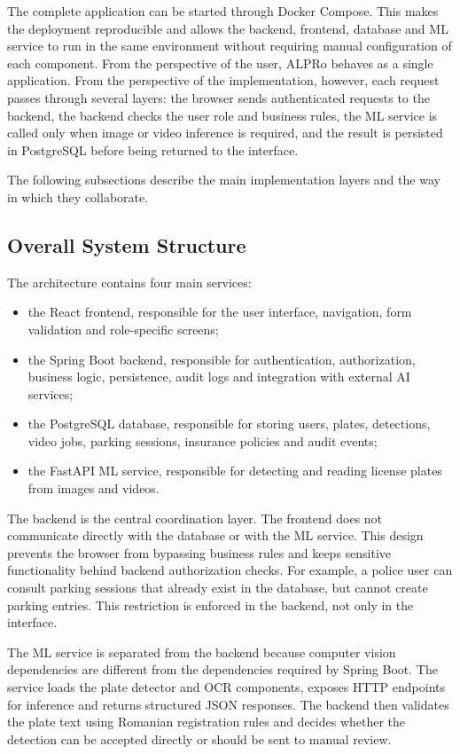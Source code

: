 ﻿\documentclass[12pt,a4paper]{article}
\begin{document}
The complete application can be started through Docker Compose. This makes the deployment reproducible and allows the backend, frontend, database and ML service to run in the same environment without requiring manual configuration of each component. From the perspective of the user, ALPRo behaves as a single application. From the perspective of the implementation, however, each request passes through several layers: the browser sends authenticated requests to the backend, the backend checks the user role and business rules, the ML service is called only when image or video inference is required, and the result is persisted in PostgreSQL before being returned to the interface.

The following subsections describe the main implementation layers and the way in which they collaborate.

\subsection{Overall System Structure}

The architecture contains four main services:

\begin{itemize}
    \item the React frontend, responsible for the user interface, navigation, form validation and role-specific screens;
    \item the Spring Boot backend, responsible for authentication, authorization, business logic, persistence, audit logs and integration with external AI services;
    \item the PostgreSQL database, responsible for storing users, plates, detections, video jobs, parking sessions, insurance policies and audit events;
    \item the FastAPI ML service, responsible for detecting and reading license plates from images and videos.
\end{itemize}

The backend is the central coordination layer. The frontend does not communicate directly with the database or with the ML service. This design prevents the browser from bypassing business rules and keeps sensitive functionality behind backend authorization checks. For example, a police user can consult parking sessions that already exist in the database, but cannot create parking entries. This restriction is enforced in the backend, not only in the interface.

The ML service is separated from the backend because computer vision dependencies are different from the dependencies required by Spring Boot. The service loads the plate detector and OCR components, exposes HTTP endpoints for inference and returns structured JSON responses. The backend then validates the plate text using Romanian registration rules and decides whether the detection can be accepted directly or should be sent to manual review.
\end{document}
